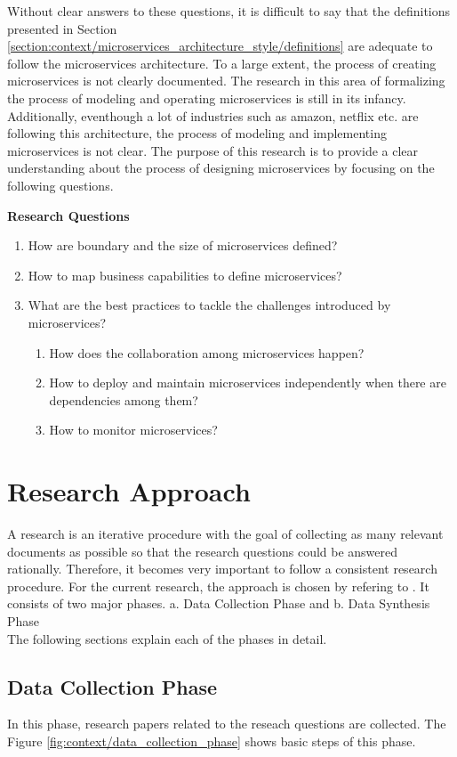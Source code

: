 Without clear answers to these questions, it is difficult to say that the definitions presented in Section \ref{section:context/microservices_architecture_style/definitions} are adequate to follow the microservices architecture. To a large extent, the process of creating microservices is not clearly documented. The research in this area of formalizing the process of modeling and operating microservices is still in its infancy. Additionally, eventhough a lot of industries such as amazon, netflix etc. are following this architecture, the process of modeling and implementing microservices is not clear. The purpose of this research is to provide a clear understanding about the process of designing microservices by focusing on the following questions.
\begin{shaded}
\textbf{Research Questions}\label{list:introduction/research_questions}
\end{shaded}
\begin{enumerate}
\item How are boundary and the size of microservices defined?
\item How to map business capabilities to define microservices?
\item What are the best practices to tackle the challenges introduced by microservices?
    \begin{enumerate}
    \item How does the collaboration among microservices happen?
    \item How to deploy and maintain microservices independently when there are dependencies among them?
    \item How to monitor microservices?
    \end{enumerate}
\end{enumerate}
\section{Research Approach}\label{section:context/approach}
A research is an iterative procedure with the goal of collecting as many relevant documents as possible so that the research questions could be answered rationally. Therefore, it becomes very important to follow a consistent research procedure. For the current research, the approach is chosen by refering to \cite{np:2007aa}. It consists of two major phases.
a. {Data Collection Phase} and 
b. {Data Synthesis Phase}
\\
The following sections explain each of the phases in detail.
\subsection{Data Collection Phase}\label{section:context/approach/data_collection_phase}
In this phase, research papers related to the reseach questions are collected. The Figure \ref{fig:context/data_collection_phase} shows basic steps of this phase.

